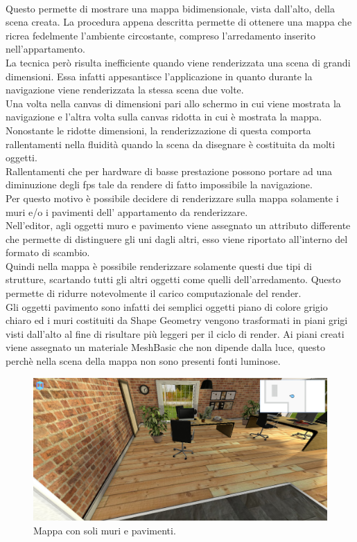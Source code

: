 \\
Questo permette di mostrare una mappa bidimensionale, vista dall’alto, della scena creata.
La procedura appena descritta permette di ottenere una mappa che ricrea fedelmente l’ambiente circostante, compreso l’arredamento inserito nell’appartamento.
\\
La tecnica però risulta inefficiente quando viene renderizzata una scena di grandi dimensioni. Essa infatti appesantisce l’applicazione in quanto durante la navigazione viene renderizzata la stessa scena due volte.
\\
Una volta nella canvas di dimensioni pari allo schermo in cui viene mostrata la navigazione e l’altra volta sulla canvas ridotta in cui è mostrata la mappa. Nonostante le ridotte dimensioni, la renderizzazione di questa comporta rallentamenti nella fluidità quando la scena da disegnare è costituita da molti oggetti.
\\
Rallentamenti che per hardware di basse prestazione possono portare ad una diminuzione degli fps tale da rendere di fatto impossibile la navigazione.
\\
Per questo motivo è possibile decidere di renderizzare sulla mappa solamente i muri e/o i pavimenti dell’ appartamento da renderizzare.
\\
Nell’editor, agli oggetti muro e pavimento viene assegnato un attributo differente che permette di distinguere gli uni dagli altri, esso viene riportato all’interno del formato di scambio.
\\
Quindi nella mappa è possibile renderizzare solamente questi due tipi di strutture, scartando tutti gli altri oggetti come quelli dell’arredamento. Questo permette di ridurre notevolmente il carico computazionale del render. 
\\
Gli oggetti pavimento sono infatti dei semplici oggetti piano di colore grigio chiaro ed i muri costituiti da Shape Geometry vengono trasformati in piani grigi visti dall’alto al fine di risultare più leggeri per il ciclo di render. Ai piani creati viene assegnato un materiale MeshBasic che non dipende dalla luce, questo perchè nella scena della mappa non sono presenti fonti luminose.
\begin{figure}[htb]
 \centering
 \includegraphics[width=1\linewidth]{images/chapter_navigazione_scena/map_2d_json.png}\hfill
 \caption[Mappa con soli muri e pavimenti.]{Mappa con soli muri e pavimenti.}
 \label{fig:navigazione_scena_map_2d_json}
\end{figure}


